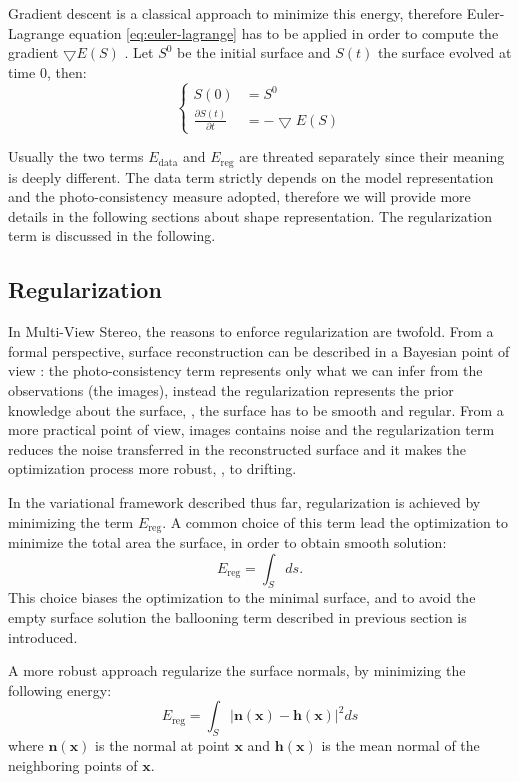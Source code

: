 Gradient descent is a classical approach to minimize this energy, therefore Euler-Lagrange equation \eqref{eq:euler-lagrange} has to be applied in order to compute the gradient $\bigtriangledown E(\mathit{S})$ \cite{hermosillo2002variational}. Let $\mathit{S}^0$ be the initial surface and $\mathit{S}(t)$ the surface evolved at time $0$, then:
\begin{equation}
 \begin{cases}
  \mathit{S}(0) &=\mathit{S}^0\\
  \frac{\partial \mathit{S}(t)}{\partial t} & = -\bigtriangledown E(\mathit{S})
 \end{cases}
\end{equation}

Usually the two terms $E_{\text{data}}$ and $E_{\text{reg}}$ are threated separately since their meaning is deeply different.
The data term strictly depends on the model representation and the photo-consistency measure adopted, therefore we will provide more details in the following sections about shape representation. 
The regularization term is discussed in the following.
\subsection{Regularization}
In Multi-View Stereo, the reasons to enforce regularization are twofold. From a formal perspective, surface reconstruction can be described in a Bayesian point of view \cite[p. 11]{delaunoy2011modelisation}: the photo-consistency term represents only what we can infer from the observations (the images), instead the regularization represents the prior knowledge about the surface, \ie, the surface has to be smooth and regular. 
From a more practical point of view, images contains noise and the regularization term reduces the noise transferred in the reconstructed surface and it makes the optimization process more robust, \eg, to drifting.

In the variational framework described thus far, regularization is achieved by minimizing the term $E_{\text{reg}}$. 
A common choice of this term lead the optimization to minimize the total area the surface, in order to obtain smooth solution:
\[
E_{\text{reg}} = \int_{\mathit{S}} ds.
\]
This choice biases the optimization to the minimal surface, and to avoid the empty surface solution the ballooning term described in previous section is introduced.

A more robust approach regularize the surface normals, by minimizing the following energy:
\[
E_{\text{reg}} = \int_{\mathit{S}} |\mathbf{n}(\mathbf{x}) - \mathbf{h}(\mathbf{x})|^2 ds
\]
where $\mathbf{n}(\mathbf{x})$ is the normal at point $\mathbf{x}$ and $\mathbf{h}(\mathbf{x})$ is the mean normal of the neighboring points of $\mathbf{x}$.

